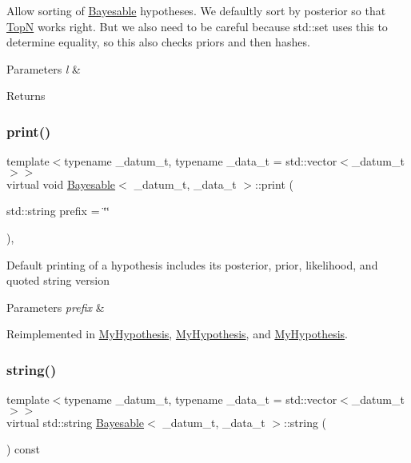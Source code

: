 Allow sorting of \hyperlink{class_bayesable}{Bayesable} hypotheses. We defaultly sort by posterior so that \hyperlink{class_top_n}{TopN} works right. But we also need to be careful because std\+::set uses this to determine equality, so this also checks priors and then hashes. 
\begin{DoxyParams}{Parameters}
{\em l} & \\
\hline
\end{DoxyParams}
\begin{DoxyReturn}{Returns}

\end{DoxyReturn}
\mbox{\label{class_bayesable_a87d5d9481d6a72b017e44b175071fa5e}} 
\subsubsection{\texorpdfstring{print()}{print()}}
{\footnotesize\ttfamily template$<$typename \+\_\+datum\+\_\+t, typename \+\_\+data\+\_\+t = std\+::vector$<$\+\_\+datum\+\_\+t$>$$>$ \\
virtual void \hyperlink{class_bayesable}{Bayesable}$<$ \+\_\+datum\+\_\+t, \+\_\+data\+\_\+t $>$\+::print (\begin{DoxyParamCaption}\item[{std\+::string}]{prefix = {\ttfamily \char`\"{}\char`\"{}} }\end{DoxyParamCaption})\hspace{0.3cm}{\ttfamily [inline]}, {\ttfamily [virtual]}}

Default printing of a hypothesis includes its posterior, prior, likelihood, and quoted string version 
\begin{DoxyParams}{Parameters}
{\em prefix} & \\
\hline
\end{DoxyParams}


Reimplemented in \hyperlink{class_my_hypothesis_a91fd22a2724e04c0e7c67ea4282beac4}{My\+Hypothesis}, \hyperlink{class_my_hypothesis_a81fa991ffd2cabe6f71ec129ae26ca6c}{My\+Hypothesis}, and \hyperlink{class_my_hypothesis_a91fd22a2724e04c0e7c67ea4282beac4}{My\+Hypothesis}.

\mbox{\label{class_bayesable_afcea9b439bcf321d5354710d8861cb54}} 
\subsubsection{\texorpdfstring{string()}{string()}}
{\footnotesize\ttfamily template$<$typename \+\_\+datum\+\_\+t, typename \+\_\+data\+\_\+t = std\+::vector$<$\+\_\+datum\+\_\+t$>$$>$ \\
virtual std\+::string \hyperlink{class_bayesable}{Bayesable}$<$ \+\_\+datum\+\_\+t, \+\_\+data\+\_\+t $>$\+::string (\begin{DoxyParamCaption}{ }\end{DoxyParamCaption}) const\hspace{0.3cm}{\ttfamily [pure virtual]}}



